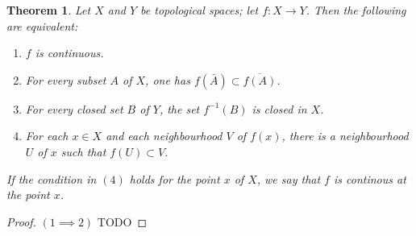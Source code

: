 \documentclass[12pt,reqno]{amsart}
\theoremstyle{plain}
\newtheorem{thm}{Theorem}
\theoremstyle{definition}
\begin{document}
\begin{thm}
    Let $X$ and $Y$ be topological spaces; let $f:X \to Y$. Then the following are equivalent:
    \begin{enumerate}
        \item $f$ is continuous.
        \item For every subset $A$ of $X$, one has $f(\bar{A})\subset \overline{f(A)}$.
        \item For every closed set $B$ of $Y$, the set $f^{-1}(B)$ is closed in $X$.
        \item For each $x\in X$ and each neighbourhood $V$ of $f(x)$, there is a neighbourhood $U$ of $x$ such that $f(U) \subset V$.
    \end{enumerate}   
    If the condition in $(4)$ holds for the point $x$ of $X$, we say that $f$ is continous at the point $x$.
\end{thm}
\begin{proof}
    $(1 \implies 2)$ TODO
\end{proof}
\end{document}
